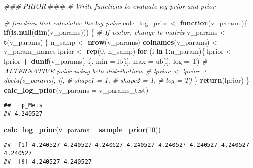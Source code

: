 \documentclass[
]{article}
\newenvironment{Shaded}{\begin{snugshade}}{\end{snugshade}}
\newcommand{\AlertTok}[1]{\textcolor[rgb]{0.94,0.16,0.16}{#1}}
\newcommand{\CommentTok}[1]{\textcolor[rgb]{0.56,0.35,0.01}{\textit{#1}}}
\newcommand{\ControlFlowTok}[1]{\textcolor[rgb]{0.13,0.29,0.53}{\textbf{#1}}}
\newcommand{\DataTypeTok}[1]{\textcolor[rgb]{0.13,0.29,0.53}{#1}}
\newcommand{\DecValTok}[1]{\textcolor[rgb]{0.00,0.00,0.81}{#1}}
\newcommand{\KeywordTok}[1]{\textcolor[rgb]{0.13,0.29,0.53}{\textbf{#1}}}
\newcommand{\NormalTok}[1]{#1}
\newcommand{\OperatorTok}[1]{\textcolor[rgb]{0.81,0.36,0.00}{\textbf{#1}}}
\newcommand{\StringTok}[1]{\textcolor[rgb]{0.31,0.60,0.02}{#1}}
\begin{document}
\begin{Shaded}
\begin{Highlighting}[]
\CommentTok{###  PRIOR  }\AlertTok{###}\CommentTok{ }
\CommentTok{# Write functions to evaluate log-prior and prior}

\CommentTok{# function that calculates the log-prior}
\NormalTok{calc_log_prior <-}\StringTok{ }\ControlFlowTok{function}\NormalTok{(v_params)\{}
  \ControlFlowTok{if}\NormalTok{(}\KeywordTok{is.null}\NormalTok{(}\KeywordTok{dim}\NormalTok{(v_params))) \{ }\CommentTok{# If vector, change to matrix}
\NormalTok{    v_params <-}\StringTok{ }\KeywordTok{t}\NormalTok{(v_params) }
\NormalTok{  \}}
\NormalTok{  n_samp <-}\StringTok{ }\KeywordTok{nrow}\NormalTok{(v_params)}
  \KeywordTok{colnames}\NormalTok{(v_params) <-}\StringTok{ }\NormalTok{v_param_names}
\NormalTok{  lprior <-}\StringTok{ }\KeywordTok{rep}\NormalTok{(}\DecValTok{0}\NormalTok{, n_samp)}
  \ControlFlowTok{for}\NormalTok{ (i }\ControlFlowTok{in} \DecValTok{1}\OperatorTok{:}\NormalTok{n_param)\{}
\NormalTok{    lprior <-}\StringTok{ }\NormalTok{lprior }\OperatorTok{+}\StringTok{ }\KeywordTok{dunif}\NormalTok{(v_params[, i],}
                             \DataTypeTok{min =}\NormalTok{ lb[i],}
                             \DataTypeTok{max =}\NormalTok{ ub[i], }
                             \DataTypeTok{log =}\NormalTok{ T)}
    \CommentTok{# ALTERNATIVE prior using beta distributions}
    \CommentTok{# lprior <- lprior + dbeta(v_params[, i],}
    \CommentTok{#                          shape1 = 1,}
    \CommentTok{#                          shape2 = 1, }
    \CommentTok{#                          log = T)}
\NormalTok{  \}}
  \KeywordTok{return}\NormalTok{(lprior)}
\NormalTok{\}}
\KeywordTok{calc_log_prior}\NormalTok{(}\DataTypeTok{v_params =}\NormalTok{ v_params_test)}
\end{Highlighting}
\end{Shaded}

\begin{verbatim}
##   p_Mets 
## 4.240527
\end{verbatim}

\begin{Shaded}
\begin{Highlighting}[]
\KeywordTok{calc_log_prior}\NormalTok{(}\DataTypeTok{v_params =} \KeywordTok{sample_prior}\NormalTok{(}\DecValTok{10}\NormalTok{))}
\end{Highlighting}
\end{Shaded}

\begin{verbatim}
##  [1] 4.240527 4.240527 4.240527 4.240527 4.240527 4.240527 4.240527 4.240527
##  [9] 4.240527 4.240527
\end{verbatim}
\end{document}
